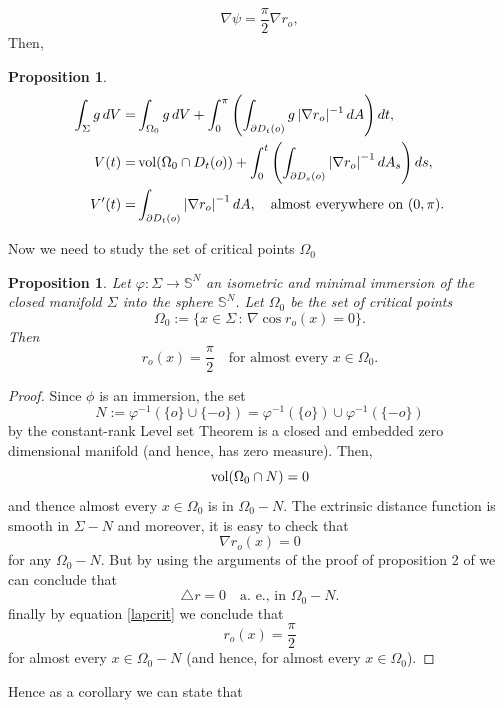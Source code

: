 \documentclass{amsart}
\newtheorem{proposition}[theorem]{Proposition}
\theoremstyle{definition}
\theoremstyle{remark}
\begin{document}
$$
\nabla \psi=\frac{\pi}{2}\nabla r_o,
$$
Then,
\begin{proposition}
\begin{equation}
    \begin{aligned}
\int_{\Sigma}g\,dV=&
\int_{\Omega_0}g\,dV+\int_{0}^\pi\left(\int_{\partial D_t(o)}g\,|\nabla r_o|^{-1}\,dA\right)dt,\\
V(t)=&\, {\rm vol}(\Omega_0\cap D_t(o))+\int_0^{t}\left(\int_{\partial D_s(o)} \left|\nabla r_o\right|^{-1} dA_{s}\right)ds,\\
V'(t)=& \int_{\partial D_t(o)} \left|\nabla r_o\right|^{-1} dA,\quad \text{almost everywhere on }(0,\pi).
\end{aligned}
\end{equation}
\end{proposition}

Now we need to study the set of critical points $\Omega_0$

\begin{proposition}\label{prop:critics}
Let $\varphi:\Sigma\to\mathbb{S}^N$ an isometric and minimal immersion of the closed manifold $\Sigma$ into the sphere $\mathbb{S}^N$. Let $\Omega_0$ be the set of critical points 
$$
\Omega_0:=\{x\in\Sigma\, :\,\nabla \cos r_o(x)=0\}.
$$
Then 
$$
r_o(x)=\frac{\pi}{2}\quad  \text{for almost every } x\in \Omega_0.
$$
\end{proposition}
\begin{proof}
Since $\phi$ is an immersion, the set 
$$
N:=\varphi^{-1}(\{o\}\cup \{-o\})= \varphi^{-1}(\{o\})\cup \varphi^{-1}(\{-o\})
$$
by the constant-rank Level set  Theorem is a closed and embedded zero dimensional manifold (and hence, has zero measure). Then, 
$$
{\rm vol}(\Omega_0 \cap N)=0
$$
and thence almost every  $x\in\Omega_0$ is in $\Omega_0-N$. The extrinsic distance function is smooth in $\Sigma-N$ and moreover, it is easy to check that
$$
\nabla r_o(x)=0
$$
for any $\Omega_0-N$.
But by using the arguments of  the proof of proposition 2 of \cite{Lima20161035} we can conclude that
$$
\triangle r=0\quad  \text {a. e., in } \Omega_0-N. 
$$
finally by equation \eqref{lapcrit} we conclude that 
$$
r_o(x)=\frac{\pi}{2}
$$
for almost every $x\in \Omega_0-N$ (and hence, for almost every $x\in \Omega_0$).
\end{proof}

Hence as a corollary we can state that
\end{document}
